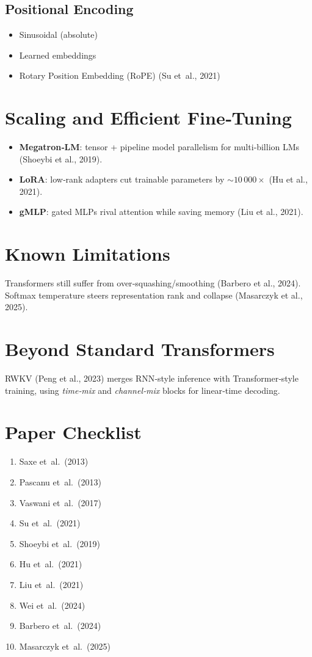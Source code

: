 \documentclass{article}
\begin{document}
\subsection{Positional Encoding}
\begin{itemize}
  \item Sinusoidal (absolute)
  \item Learned embeddings
  \item Rotary Position Embedding (RoPE) (Su et al., 2021)
\end{itemize}

\section{Scaling and Efficient Fine‑Tuning}
\begin{itemize}
  \item \textbf{Megatron‑LM}: tensor + pipeline model parallelism for multi‑billion LMs (Shoeybi et al., 2019).
  \item \textbf{LoRA}: low‑rank adapters cut trainable parameters by $\sim10\,000\times$ (Hu et al., 2021).
  \item \textbf{gMLP}: gated MLPs rival attention while saving memory (Liu et al., 2021).
\end{itemize}

\section{Known Limitations}
Transformers still suffer from over‑squashing/smoothing (Barbero et al., 2024). 
Softmax temperature steers representation rank and collapse (Masarczyk et al., 2025).

\section{Beyond Standard Transformers}
RWKV (Peng et al., 2023) merges RNN‑style inference with Transformer‑style training, using \emph{time‑mix} and \emph{channel‑mix} blocks for linear‑time decoding.

\section{Paper Checklist}
\begin{enumerate}
  \item Saxe et al.\ (2013)
  \item Pascanu et al.\ (2013)
  \item Vaswani et al.\ (2017)
  \item Su et al.\ (2021)
  \item Shoeybi et al.\ (2019)
  \item Hu et al.\ (2021)
  \item Liu et al.\ (2021)
  \item Wei et al.\ (2024)
  \item Barbero et al.\ (2024)
  \item Masarczyk et al.\ (2025)
\end{enumerate}
\end{document}
